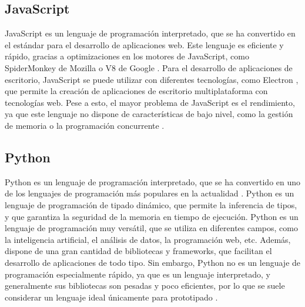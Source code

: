 \subsection{JavaScript}
JavaScript es un lenguaje de programación interpretado, que se ha convertido en el estándar para el desarrollo de aplicaciones web. Este lenguaje es eficiente y rápido, gracias a optimizaciones en los motores de JavaScript, como SpiderMonkey de Mozilla o V8 de Google \autocite{srinetChromeV8Firefox2022}. Para el desarrollo de aplicaciones de escritorio, JavaScript se puede utilizar con diferentes tecnologías, como Electron \autocite{BuildCrossplatformDesktop}, que permite la creación de aplicaciones de escritorio multiplataforma con tecnologías web. Pese a esto, el mayor problema de JavaScript es el rendimiento, ya que este lenguaje no dispone de características de bajo nivel, como la gestión de memoria o la programación concurrente \autocite{MemoryManagementJavaScript2025,pengMultithreadingJavascript2017}.

\subsection{Python}
Python es un lenguaje de programación interpretado, que se ha convertido en uno de los lenguajes de programación más populares en la actualidad \autocite{TIOBEIndex}. Python es un lenguaje de programación de tipado dinámico, que permite la inferencia de tipos, y que garantiza la seguridad de la memoria en tiempo de ejecución. Python es un lenguaje de programación muy versátil, que se utiliza en diferentes campos, como la inteligencia artificial, el análisis de datos, la programación web, etc. Además, dispone de una gran cantidad de bibliotecas y frameworks, que facilitan el desarrollo de aplicaciones de todo tipo. Sin embargo, Python no es un lenguaje de programación especialmente rápido, ya que es un lenguaje interpretado, y generalmente sus bibliotecas son pesadas y poco eficientes, por lo que se suele considerar un lenguaje ideal únicamente para prototipado \autocite{SlowestProgrammingLanguages2020}.

